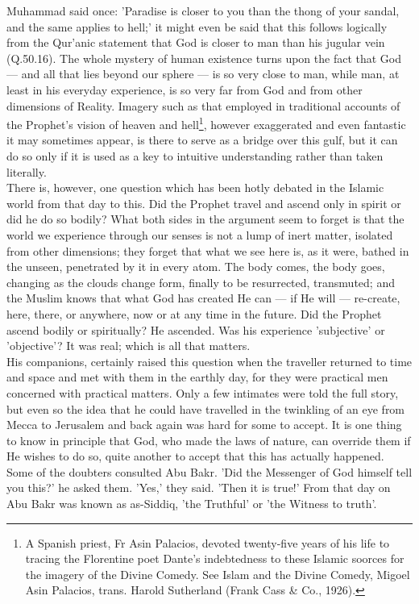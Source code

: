 \documentclass[11pt, b5paper, twoside]{book}
\begin{document}
Muhammad said once: 'Paradise is closer to you than the thong of your sandal, and the same applies to hell;' it might even be said that this follows logically from the Qur'anic statement that God is 
closer to man than his jugular vein (Q.50.16). The whole mystery of human existence turns upon the 
fact that God --- and all that lies beyond our sphere --- is so very close to man, while man, at least in 
his everyday experience, is so very far from God and from other dimensions of Reality. Imagery such 
as that employed in traditional accounts of the Prophet's vision of heaven and hell\footnote{A Spanish priest, Fr Asin Palacios, devoted twenty-five years of his life to tracing the Florentine poet Dante's indebtedness to these Islamic soorces for the imagery of the Divine Comedy. See Islam and the Divine Comedy, Migoel Asin Palacios, trans. Harold Sutherland (Frank Cass \& Co., 1926).}, however 
exaggerated and even fantastic it may sometimes appear, is there to serve as a bridge over this gulf, 
but it can do so only if it is used as a key to intuitive understanding rather than taken literally. \\ 

There is, however, one question which has been hotly debated in the Islamic world from that day to 
this. Did the Prophet travel and ascend only in spirit or did he do so bodily? What both sides in the 
argument seem to forget is that the world we experience through our senses is not a lump of inert 
matter, isolated from other dimensions; they forget that what we see here is, as it were, bathed in 
the unseen, penetrated by it in every atom. The body comes, the body goes, changing as the clouds 
change form, finally to be resurrected, transmuted; and the Muslim knows that what God has created He 
can --- if He will --- re-create, here, there, or anywhere, now or at any time in the future. Did the 
Prophet ascend bodily or spiritually? He ascended. Was his experience 'subjective' or 'objective'? It 
was real; which is all that matters. \\

His companions, certainly raised this question when the traveller returned to time and space and met 
with them in the earthly day, for they were practical men concerned with practical matters. Only a 
few intimates were told the full story, but even so the idea that he could have travelled in the 
twinkling of an eye from Mecca to Jerusalem and back again was hard for some to accept. It is one 
thing to know in principle that God, who made the laws of nature, can override them if He wishes to 
do so, quite another to accept that this has actually happened. Some of the doubters consulted Abu 
Bakr. 'Did the Messenger of God himself tell you this?' he asked them. 'Yes,' they said. 'Then it is 
true!' From that day on Abu Bakr was known as as-Siddiq, 'the Truthful' or 'the Witness to truth'. \\
\end{document}
